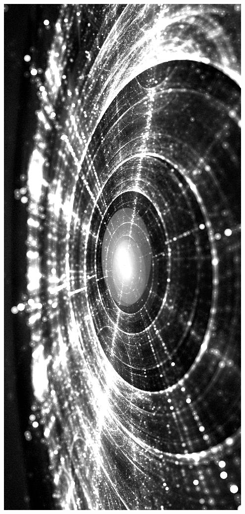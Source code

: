 \documentclass[11pt]{article}
\begin{document}
\begin{landscape}
    \begin{center}
    \includegraphics[width=\textwidth]{./nbimg/file (99).jpg}
    \end{center}


\end{landscape}
\end{document}
